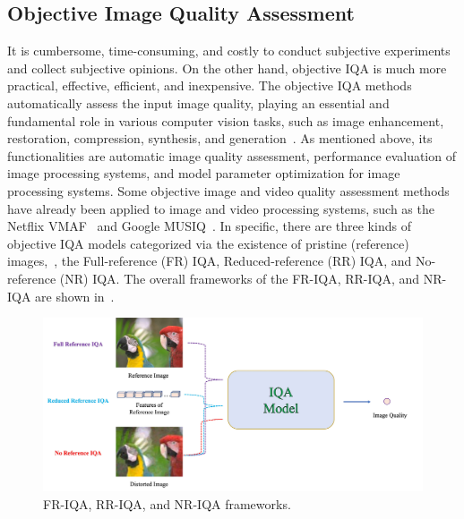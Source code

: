 	\subsection{Objective Image Quality Assessment}
	It is cumbersome, time-consuming, and costly to conduct subjective experiments and collect subjective opinions. On the other hand, objective IQA is much more practical, effective, efficient, and inexpensive. The objective IQA methods automatically assess the input image quality, playing an essential and fundamental role in various computer vision tasks, such as image enhancement, restoration, compression, synthesis, and generation~\citep{ding2021comparison, Kumar2022NR, Li2022SR, Mier2021, Li2021QA, isogawa2019better, zhang2019ranksrgan}. As mentioned above, its functionalities are automatic image quality assessment, performance evaluation of image processing systems, and model parameter optimization for image processing systems. Some objective image and video quality assessment methods have already been applied to image and video processing systems, such as the Netflix VMAF~\citep{li2016toward} and Google MUSIQ~\citep{ke2021musiq}. In specific, there are three kinds of objective IQA models categorized via the existence of pristine (reference) images,~\ie, the Full-reference (FR) IQA, Reduced-reference (RR) IQA, and No-reference (NR) IQA. The overall frameworks of the FR-IQA, RR-IQA, and NR-IQA are shown in~.
	\begin{figure}[!ht]
		\centering
		\begin{minipage}[t]{\linewidth}
			\centering
			\includegraphics[width=6in]{fig/IQA.jpg}
		\end{minipage}
		\caption{FR-IQA, RR-IQA, and NR-IQA frameworks.}
		\label{IQA}
	\end{figure}
	
